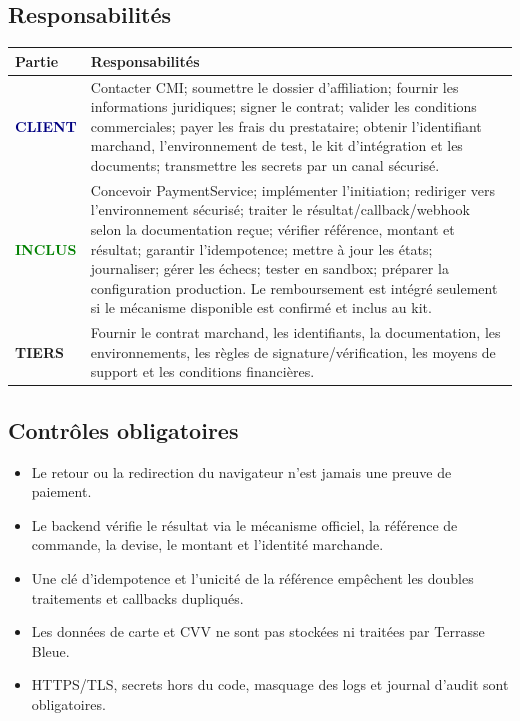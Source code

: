 \documentclass[10pt,a4paper]{article}
\newcommand{\tagbox}[2]{\colorbox{#1!14}{\textcolor{#1}{\textbf{\scriptsize #2}}}}
\newcommand{\included}{\tagbox{green}{INCLUS}}
\newcommand{\client}{\tagbox{navy}{CLIENT}}
\newcommand{\thirdparty}{\tagbox{terracotta}{TIERS}}
\begin{document}
\subsection{Responsabilités}
\begin{longtable}{@{}L{3cm}L{12.7cm}@{}}
\toprule
\textbf{Partie} & \textbf{Responsabilités} \\
\midrule
\client & Contacter CMI; soumettre le dossier d'affiliation; fournir les informations juridiques; signer le contrat; valider les conditions commerciales; payer les frais du prestataire; obtenir l'identifiant marchand, l'environnement de test, le kit d'intégration et les documents; transmettre les secrets par un canal sécurisé. \\
\included & Concevoir PaymentService; implémenter l'initiation; rediriger vers l'environnement sécurisé; traiter le résultat/callback/webhook selon la documentation reçue; vérifier référence, montant et résultat; garantir l'idempotence; mettre à jour les états; journaliser; gérer les échecs; tester en sandbox; préparer la configuration production. Le remboursement est intégré seulement si le mécanisme disponible est confirmé et inclus au kit. \\
\thirdparty & Fournir le contrat marchand, les identifiants, la documentation, les environnements, les règles de signature/vérification, les moyens de support et les conditions financières. \\
\bottomrule
\end{longtable}

\subsection{Contrôles obligatoires}
\begin{itemize}
  \item Le retour ou la redirection du navigateur n'est jamais une preuve de paiement.
  \item Le backend vérifie le résultat via le mécanisme officiel, la référence de commande, la devise, le montant et l'identité marchande.
  \item Une clé d'idempotence et l'unicité de la référence empêchent les doubles traitements et callbacks dupliqués.
  \item Les données de carte et CVV ne sont pas stockées ni traitées par Terrasse Bleue.
  \item HTTPS/TLS, secrets hors du code, masquage des logs et journal d'audit sont obligatoires.
\end{itemize}
\end{document}
